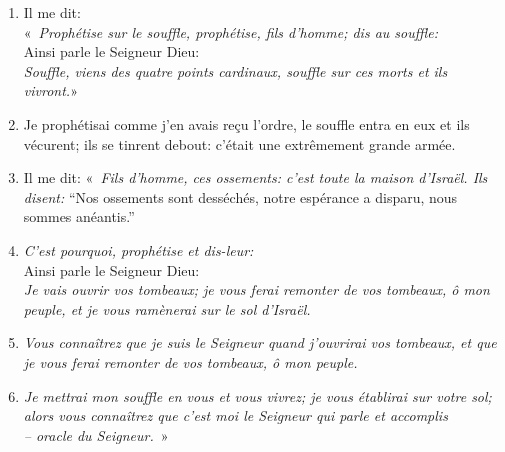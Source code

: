 \begin{enumerate}[leftmargin=\psleftmargin, labelsep = \pslabelsep, label={\arabic*}, font=\color{\pscolor}\small\textsuperscript, parsep=0em, itemsep=0em, topsep=0em ]
        mais il n’y avait pas de souffle en eux.\verseSpace
  \item {}Il me dit: \\
        «~\textit{Prophétise sur le souffle, prophétise, fils d’homme; \brk
          dis au souffle:}\\
        Ainsi parle le Seigneur Dieu: \\
        \textit{Souffle, viens des quatre points cardinaux, \brk
          souffle sur ces morts et ils vivront.}»
  \item {}Je prophétisai comme j’en avais reçu l’ordre, \brk
        le souffle entra en eux et ils vécurent; \brk
        ils se tinrent debout: \brk
        c’était une extrêmement grande armée.\newpage
  \item {Il me dit: \brk
          «~\textit{Fils d’homme, ces ossements: \brk
            c’est toute la maison d’Israël. \brk
            Ils disent:} \brk
          “Nos ossements sont desséchés,\brk
          notre espérance a disparu, \brk
          nous sommes anéantis.”}
  \item {}\textit{C’est pourquoi, prophétise et dis-leur:} \\
        Ainsi parle le Seigneur Dieu: \\
        \textit{Je vais ouvrir vos tombeaux; \brk
          je vous ferai remonter de vos tombeaux, ô mon peuple, \brk
          et je vous ramènerai sur le sol d’Israël.}
  \item {}\textit{Vous connaîtrez que je suis le Seigneur \brk
          quand j’ouvrirai vos tombeaux, \brk
          et que je vous ferai remonter de vos tombeaux, ô mon peuple.}
  \item {}\textit{Je mettrai mon souffle en vous et vous vivrez; \brk
          je vous établirai sur votre sol; \brk
          alors vous connaîtrez que c’est moi le Seigneur qui parle et accomplis \\
          – oracle du Seigneur.}~»\parSpace


\end{enumerate}
